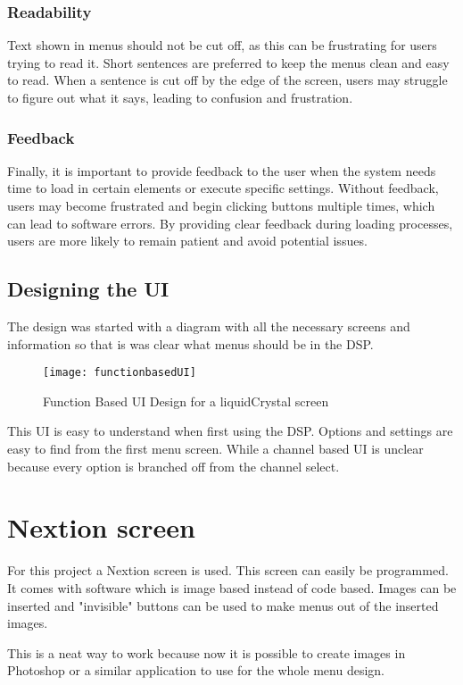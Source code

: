 \subsubsection*{Readability}
Text shown in menus should not be cut off, as this can be frustrating for users trying to read it. Short sentences are preferred to keep the menus clean and easy to read. When a sentence is cut off by the edge of the screen, users may struggle to figure out what it says, leading to confusion and frustration.

\subsubsection*{Feedback}
Finally, it is important to provide feedback to the user when the system needs time to load in certain elements or execute specific settings. Without feedback, users may become frustrated and begin clicking buttons multiple times, which can lead to software errors. By providing clear feedback during loading processes, users are more likely to remain patient and avoid potential issues.

\subsection{Designing the UI}
The design was started with a diagram with all the necessary screens and information so that is was clear what menus should be in the DSP. 

\begin{figure}[ht]
    \texttt{[image: functionbasedUI]}
    \caption{Function Based UI Design for a liquidCrystal screen}
    \label{fig:functionbasedUI}
\end{figure}

This UI is easy to understand when first using the DSP. Options and settings are easy to find from the first menu screen. While a channel based UI is unclear because every option is branched off from the channel select.

\section{Nextion screen}

For this project a Nextion screen is used. This screen can easily be programmed. It comes with software which is image based instead of code based. Images can be inserted and "invisible" buttons can be used to make menus out of the inserted images.

This is a neat way to work because now it is possible to create images in Photoshop or a similar application to use for the whole menu design.